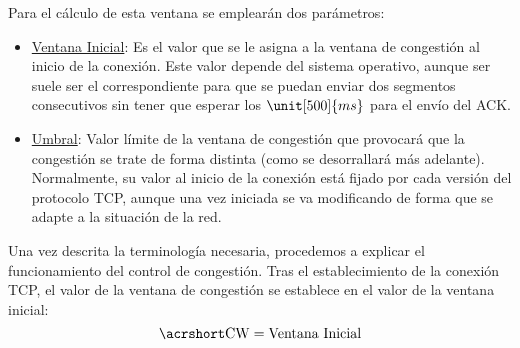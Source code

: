 Para el cálculo de esta ventana se emplearán dos parámetros:
\begin{itemize}
    \item \ul{Ventana Inicial}: Es el valor que se le asigna a la ventana de congestión al inicio de la conexión. Este valor depende del sistema operativo, aunque ser suele ser el correspondiente para que se puedan enviar dos segmentos consecutivos sin tener que esperar los $\unit[500]{ms}$ para el envío del \acrshort{ACK}.
    \item \ul{Umbral}: Valor límite de la ventana de congestión que provocará que la congestión se trate de forma distinta (como se desorrallará más adelante). Normalmente, su valor al inicio de la conexión está fijado por cada versión del protocolo \acrshort{TCP}, aunque una vez iniciada se va modificando de forma que se adapte a la situación de la red.
\end{itemize}

Una vez descrita la terminología necesaria, procedemos a explicar el funcionamiento del control de congestión. Tras el establecimiento de la conexión \acrshort{TCP}, el valor de la ventana de congestión se establece en el valor de la ventana inicial:
\begin{equation*}
    \cw = \text{Ventana Inicial}
\end{equation*}

